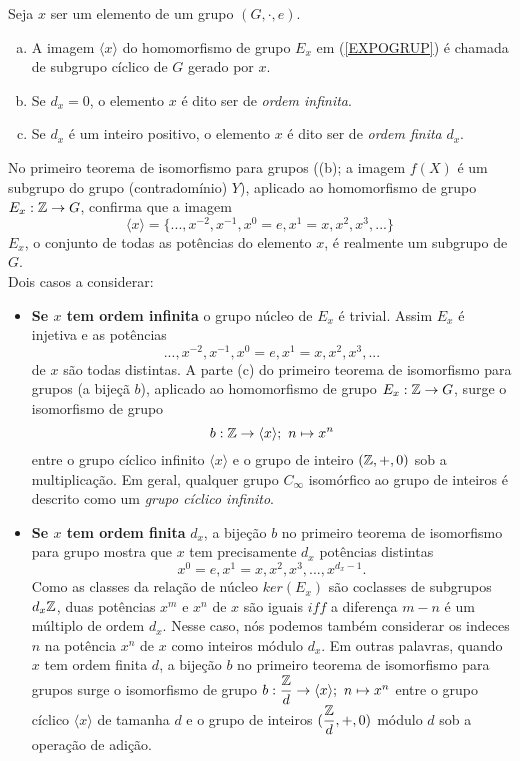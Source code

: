 \begin{definition}
  Seja $x$ ser um elemento de um grupo $(G,\cdot,e)$.
  \begin{enumerate}[(a)]
    \item A imagem $\langle x \rangle$ do homomorfismo de grupo $E_{x}$ em (\ref{EXPOGRUP}) é chamada de subgrupo cíclico de $G$ gerado por $x$.
    \item Se $d_{x} = 0$, o elemento $x$ é dito ser de \emph{ordem infinita}.
    \item Se $d_{x}$ é um inteiro positivo, o elemento $x$ é dito ser de \emph{ordem finita} $d_{x}$.
  \end{enumerate}
\end{definition}
No primeiro teorema de isomorfismo para grupos ((b); a imagem $f(X)$ é um subgrupo do grupo (contradomínio) $Y$), aplicado ao homomorfismo de grupo $E_{x}: \mathbb{Z} \to G$, confirma que a imagem
$$ \langle x \rangle = \{..., x^{-2} , x^{-1} , x^{0} = e, x^{1} = x, x^{2} , x^{3} , ...\}$$
$E_{x}$, o conjunto de todas as potências do elemento $x$, é realmente um subgrupo de $G$.\\
Dois casos a considerar:
\begin{itemize}
  \item \textbf{Se $x$ tem ordem infinita} o grupo núcleo de $E_{x}$ é trivial. Assim $E_{x}$ é injetiva e as potências $$... , x^{-2} , x^{-1} , x^{0} = e , x^{1} = x , x^{2} , x^{3} , ... $$ de $x$ são todas distintas. A parte (c) do primeiro teorema de isomorfismo para grupos (a bijeçã $b$), aplicado ao homomorfismo de grupo $E_{x}: \mathbb{Z} \to G$, surge o isomorfismo de grupo $$b:\mathbb{Z} \to \langle x \rangle ;\ n \mapsto x^{n}$$ entre o grupo cíclico infinito $\langle x \rangle$ e o grupo de inteiro $(\mathbb{Z}, +, 0)$ sob a multiplicação. Em geral, qualquer grupo $C_{\infty}$ isomórfico ao grupo de inteiros é descrito como um \emph{grupo cíclico infinito}.
  \item \textbf{Se $x$ tem ordem finita} $d_{x}$, a bijeção $b$ no primeiro teorema de isomorfismo para grupo mostra que $x$ tem precisamente $d_{x}$ potências distintas $$x^{0} = e, x^{1} = x, x^{2}, x^{3}, ... , x^{d_{x}-1}.$$ Como as classes da relação de núcleo $ker(E_{x})$ são coclasses de subgrupos $d_{x}\mathbb{Z}$, duas potências $x^{m}$ e $x^{n}$ de $x$ são iguais $iff$ a diferença $m - n$ é um múltiplo de ordem $d_{x}$. Nesse caso, nós podemos também considerar os indeces $n$ na potência $x^{n}$ de $x$ como inteiros módulo $d_{x}$. Em outras palavras, quando $x$ tem ordem finita $d$, a bijeção $b$ no primeiro teorema de isomorfismo para grupos surge o isomorfismo de grupo $b: \dfrac{\mathbb{Z}}{d} \to \langle x \rangle;\ n \mapsto x^{n}$ entre o grupo cíclico $\langle x \rangle$ de tamanha $d$ e o grupo de inteiros $(\dfrac{\mathbb{Z}}{d}, +, 0)$ módulo $d$ sob a operação de adição.
\end{itemize}
